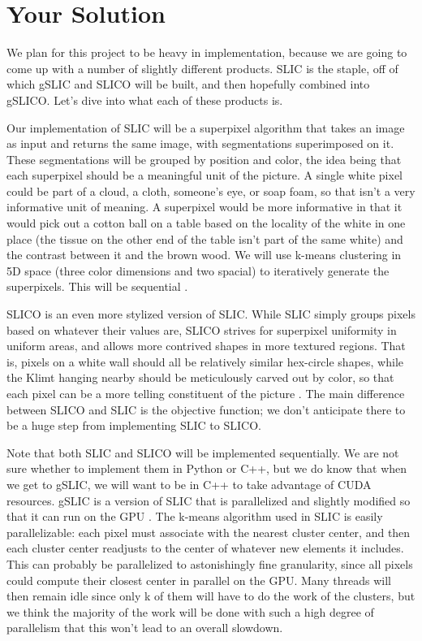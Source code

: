 \documentclass[11pt]{article}
\begin{document}
\section {Your Solution}\label{soln}

We plan for this project to be heavy in implementation, because we are going to come up with a number of slightly different products. SLIC is the staple, off of which gSLIC and SLICO will be built, and then hopefully combined into gSLICO. Let's dive into what each of these products is.

Our implementation of SLIC will be a superpixel algorithm that takes an image as input and returns the same image, with segmentations superimposed on it. These segmentations will be grouped by position and color, the idea being that each superpixel should be a meaningful unit of the picture. A single white pixel could be part of a cloud, a cloth, someone's eye, or soap foam, so that isn't a very informative unit of meaning. A superpixel would be more informative in that it would pick out a cotton ball on a table based on the locality of the white in one place (the tissue on the other end of the table isn't part of the same white) and the contrast between it and the brown wood. We will use k-means clustering in 5D space (three color dimensions and two spacial) to iteratively generate the superpixels. This will be sequential \cite{slic}.

SLICO is an even more stylized version of SLIC. While SLIC simply groups pixels based on whatever their values are, SLICO strives for superpixel uniformity in uniform areas, and allows more contrived shapes in more textured regions. That is, pixels on a white wall should all be relatively similar hex-circle shapes, while the Klimt hanging nearby should be meticulously carved out by color, so that each pixel can be a more telling constituent of the picture \cite{slic2012}. The main difference between SLICO and SLIC is the objective function; we don't anticipate there to be a huge step from implementing SLIC to SLICO.

Note that both SLIC and SLICO will be implemented sequentially. We are not sure whether to implement them in Python or C++, but we do know that when we get to gSLIC, we will want to be in C++ to take advantage of CUDA resources. gSLIC is a version of SLIC that is parallelized and slightly modified so that it can run on the GPU \cite{gslic}. The k-means algorithm used in SLIC is easily parallelizable: each pixel must associate with the nearest cluster center, and then each cluster center readjusts to the center of whatever new elements it includes. This can probably be parallelized to astonishingly fine granularity, since all pixels could compute their closest center in parallel on the GPU. Many threads will then remain idle since only k of them will have to do the work of the clusters, but we think the majority of the work will be done with such a high degree of parallelism that this won't lead to an overall slowdown.
\end{document}
